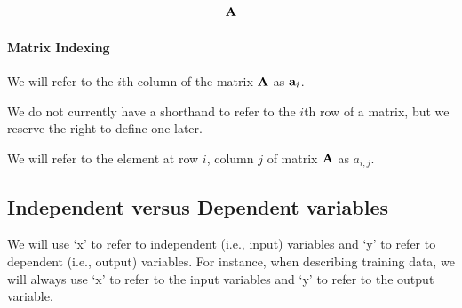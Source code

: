 \documentclass{tufte-handout}
\begin{document}
\begin{align}
\mathbf{A}
\end{align}

\paragraph{Matrix Indexing}
\be
\item We will refer to the $i$th column of the matrix $\mathbf{A}$ as $\mathbf{a}_{i}$.
\item We do not currently have a shorthand to refer to the $i$th row of a matrix, but we reserve the right to define one later.%
\item We will refer to the element at row $i$, column $j$ of matrix $\mathbf{A}$ as $a_{i, j}$.
\ee



\subsection{Independent versus Dependent variables}
We will use `x' to refer to independent (i.e., input) variables and `y' to refer to dependent (i.e., output) variables.  For instance, when describing training data, we will always use `x' to refer to the input variables and `y' to refer to the output variable.
\end{document}
